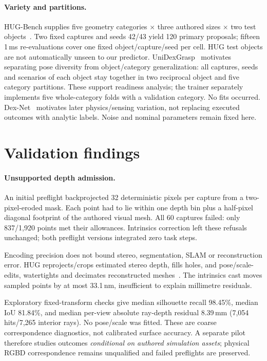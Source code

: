 \paragraph{Variety and partitions.}
HUG-Bench supplies five geometry categories $\times$ three authored sizes $\times$ two test objects~\citep{hug}. Two fixed captures and seeds 42/43 yield 120 primary proposals; fifteen 1\,ms re-evaluations cover one fixed object/capture/seed per cell. HUG test objects are not automatically unseen to our predictor. UniDexGrasp~\citep{unidex} motivates separating pose diversity from object/category generalization: all captures, seeds and scenarios of each object stay together in two reciprocal object and five category partitions. These support readiness analysis; the trainer separately implements five whole-category folds with a validation category. No fits occurred. Dex-Net~\citep{dexnet} motivates later physics/sensing variation, not replacing executed outcomes with analytic labels. Noise and nominal parameters remain fixed here.

\section{Validation findings}
\paragraph{Unsupported depth admission.}
An initial preflight backprojected 32 deterministic pixels per capture from a two-pixel-eroded mask. Each point had to lie within one depth bin plus a half-pixel diagonal footprint of the authored visual mesh. All 60 captures failed: only 837/1,920 points met their allowances. Intrinsics correction left these refusals unchanged; both preflight versions integrated zero task steps.

Encoding precision does not bound stereo, segmentation, SLAM or reconstruction error. HUG reprojects/crops estimated stereo depth, fills holes, and pose/scale-edits, watertights and decimates reconstructed meshes~\citep{hug,aria2mesh}. The intrinsics cast moves sampled points by at most 33.1\,nm, insufficient to explain millimetre residuals.

Exploratory fixed-transform checks give median silhouette recall 98.45\%, median IoU 81.84\%, and median per-view absolute ray-depth residual 8.39\,mm (7,054 hits/7,265 interior rays). No pose/scale was fitted. These are coarse correspondence diagnostics, not calibrated surface accuracy. A separate pilot therefore studies outcomes \emph{conditional on authored simulation assets}; physical RGBD correspondence remains unqualified and failed preflights are preserved.

